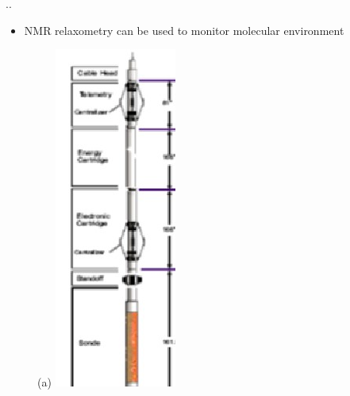 \documentclass{beamer}
\begin{document}
	
	\begin{frame}{\thesection.\thesubsection. \insertsubsection}
		\begin{itemize}
			\item NMR relaxometry can be used to monitor molecular environment
		\end{itemize}

		\begin{figure}[ht]
					
						
			\begin{minipage}[t]{0.15\textwidth}
				\centering
				(a)
				\includegraphics[width=\textwidth]{well_logging1.jpg}

\end{minipage}
\end{figure}
\end{frame}
\end{document}
